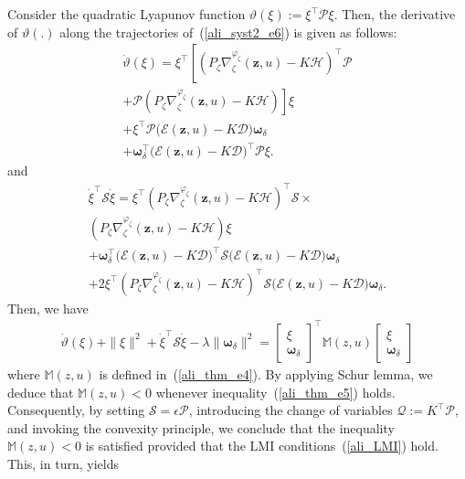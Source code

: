 \documentclass{ifacconf}
\def\eqref#1{(\ref{#1})}
\begin{document}
%
\begin{pf}
Consider the quadratic Lyapunov function $\vartheta(\xi) := \xi^{\top} \mathcal{P} \xi$. Then, the derivative of $\vartheta(.)$ along the trajectories of~\eqref{ali_syst2_e6} is given as follows:
\begin{multline}\label{ali_thm_e1}
\dot{\vartheta}(\xi) = \xi^{\top} \left[ \left( P_{\zeta} \nabla^{\varphi_{\zeta}}_{\zeta}(\bm{z},u) - K  \mathcal{H} \right)^{\top} \mathcal{P}\right. \\
+ \left. \mathcal{P} \left( P_{\zeta} \nabla^{\varphi_{\zeta}}_{\zeta}(\bm{z},u) - K  \mathcal{H} \right) \right] \xi \\
+  \xi^{\top} \mathcal{P} \Big( \mathcal{E}\left( \bm{z},u\right) - K  \mathcal{D}\Big) \bm{\omega}_{\delta} \\
+  \bm{\omega}^{\top}_{\delta} \Big( \mathcal{E}\left( \bm{z},u\right) - K  \mathcal{D}\Big)^{\top} \mathcal{P} \xi .
\end{multline}
and
{\small
\begin{multline}\label{ali_thm_e2}
 \dot{\xi}^{\top} \mathcal{S} \dot{\xi}  = \xi^{\top} \left( P_{\zeta} \nabla^{\varphi_{\zeta}}_{\zeta}(\bm{z},u) - K  \mathcal{H} \right)^{\top} \mathcal{S} \times \\ \left( P_{\zeta} \nabla^{\varphi_{\zeta}}_{\zeta}(\bm{z},u) - K  \mathcal{H} \right) \xi \\
+  \bm{\omega}^{\top}_{\delta} \Big( \mathcal{E}\left( \bm{z},u\right) - K  \mathcal{D}\Big)^{\top}\mathcal{S} \Big( \mathcal{E}\left( \bm{z},u\right) - K  \mathcal{D}\Big) \bm{\omega}_{\delta} \\
+ 2 \xi^{\top} \left( P_{\zeta} \nabla^{\varphi_{\zeta}}_{\zeta}(\bm{z},u) - K  \mathcal{H} \right)^{\top} \mathcal{S} \Big( \mathcal{E}\left( \bm{z},u\right) - K  \mathcal{D}\Big) \bm{\omega}_{\delta}.
\end{multline}
}
Then, we have
{\small
\begin{multline}\label{ali_thm_e3}
\dot{\vartheta}(\xi) + \| \xi \|^{2} + \dot{\xi}^{\top} \mathcal{S} \dot{\xi} - \lambda \| \bm{\omega}_{\delta} \|^{2} = \begin{bmatrix} \xi \\ \bm{\omega}_{\delta}\end{bmatrix}^{\top} \mathbb{M}\left( z,u \right) \begin{bmatrix} \xi \\ \bm{\omega}_{\delta}\end{bmatrix}
\end{multline}
}
where $\mathbb{M}\left( z,u \right)$ is defined in~\eqref{ali_thm_e4}. By applying Schur lemma, we deduce that $\mathbb{M}(z,u) < 0$ whenever inequality~\eqref{ali_thm_e5} holds. Consequently, by setting $\mathcal{S} = \epsilon \mathcal{P}$, introducing the change of variables $\mathcal{Q} := K^{\top} \mathcal{P}$, and invoking the convexity principle, we conclude that the inequality $\mathbb{M}(z,u) < 0$ is satisfied provided that the LMI conditions~\eqref{ali_LMI} hold. This, in turn, yields

\end{pf}
\end{document}
